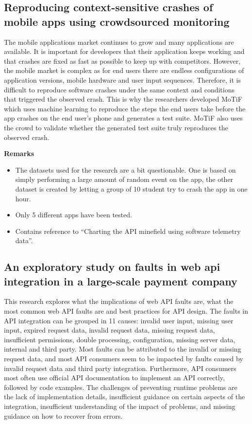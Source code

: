 \documentclass[]{book}
\providecommand{\tightlist}{%
  \setlength{\itemsep}{0pt}\setlength{\parskip}{0pt}}
\begin{document}
\subsection{Reproducing context-sensitive crashes of mobile apps using
crowdsourced
monitoring}\label{reproducing-context-sensitive-crashes-of-mobile-apps-using-crowdsourced-monitoring}

The mobile applications market continues to grow and many applications
are available. It is important for developers that their application
keeps working and that crashes are fixed as fast as possible to keep up
with competitors. However, the mobile market is complex as for end users
there are endless configurations of application versions, mobile
hardware and user input sequences. Therefore, it is difficult to
reproduce software crashes under the same context and conditions that
triggered the observed crash. This is why the researchers developed
MoTiF which uses machine learning to reproduce the steps the end users
take before the app crashes on the end user's phone and generates a test
suite. MoTiF also uses the crowd to validate whether the generated test
suite truly reproduces the observed crash.

\textbf{Remarks}

\begin{itemize}
\tightlist
\item
  The datasets used for the research are a bit questionable. One is
  based on simply performing a large amount of random event on the app,
  the other dataset is created by letting a group of 10 student try to
  crash the app in one hour.
\item
  Only 5 different apps have been tested.
\item
  Contains reference to ``Charting the API minefield using software
  telemetry data''.
\end{itemize}

\subsection{An exploratory study on faults in web api integration in a
large-scale payment
company}\label{an-exploratory-study-on-faults-in-web-api-integration-in-a-large-scale-payment-company}

This research explores what the implications of web API faults are, what
the most common web API faults are and best practices for API design.
The faults in API integration can be grouped in 11 causes: invalid user
input, missing user input, expired request data, invalid request data,
missing request data, insufficient permissions, double processing,
configuration, missing server data, internal and third party. Most
faults can be attributed to the invalid or missing request data, and
most API consumers seem to be impacted by faults caused by invalid
request data and third party integration. Furthermore, API consumers
most often use official API documentation to implement an API correctly,
followed by code examples. The challenges of preventing runtime problems
are the lack of implementation details, insufficient guidance on certain
aspects of the integration, insufficient understanding of the impact of
problems, and missing guidance on how to recover from errors.
\end{document}
